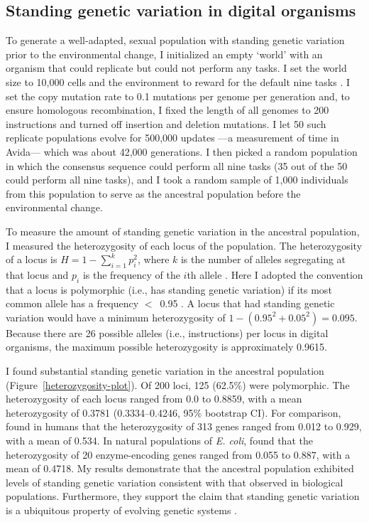 \begin{doublespace}
\section{Standing genetic variation in digital organisms}



To generate a well-adapted, sexual population
with standing genetic variation prior to the environmental change,
I initialized an empty `world' with an organism
that could replicate but could not perform any tasks.
%
I set the world size to 10,000 cells
and the environment to reward for
the default nine tasks \citep{len99}.
%
I set the copy mutation rate to 0.1 mutations
per genome per generation and,
to ensure homologous recombination,
I fixed the length of all genomes to 200 instructions
and turned off insertion and deletion mutations.
%
I let 50 such replicate populations evolve
for 500,000 updates%
---a measurement of time in Avida---%
which was about 42,000 generations.
%
I then picked a random population in which
the consensus sequence could perform all nine tasks
(35 out of the 50 could perform all nine tasks),
and I took a random sample of 1,000 individuals
from this population to serve as
the ancestral population before the environmental change.



To measure the amount of standing genetic variation
in the ancestral population,
I measured the heterozygosity of each locus of the population.
%
The heterozygosity of a locus is $H = 1 - \sum_{i = 1}^{k} p_i^{2}$,
where $k$ is the number of alleles segregating at that locus
and $p_i$ is the frequency of the $i$th allele \citep[p.~15]{gil04}.
%
Here I adopted the convention that a locus
is polymorphic (i.e., has standing genetic variation)
if its most common allele has a frequency $<$~0.95 \citep[p.~53]{har97}.
%
A locus that had standing genetic variation
would have a minimum heterozygosity of
$1 - (0.95^{2} + 0.05^{2}) = 0.095$.
%
Because there are 26 possible alleles (i.e., instructions)
per locus in digital organisms,
the maximum possible heterozygosity is approximately 0.9615.



I found substantial standing genetic variation
in the ancestral population (Figure~\ref{heterozygosity-plot}).
%
Of 200 loci, 125 (62.5\%) were polymorphic.
%
The heterozygosity of each locus ranged from 0.0 to 0.8859,
with a mean heterozygosity of 0.3781 (0.3334--0.4246, 95\% bootstrap CI).
%
For comparison, \citet{ste01} found in humans
that the heterozygosity of 313 genes
ranged from 0.012 to 0.929, with a mean of 0.534.
%
In natural populations of \emph{E. coli}, \citet{sel80} found
that the heterozygosity of 20 enzyme-encoding genes
ranged from 0.055 to 0.887, with a mean of 0.4718.
%
My results demonstrate that the ancestral population
exhibited levels of standing genetic variation
consistent with that observed in biological populations.
%
Furthermore, they support the claim that standing genetic variation
is a ubiquitous property of evolving genetic systems \citep{gib04,bar08}.




\end{doublespace}

